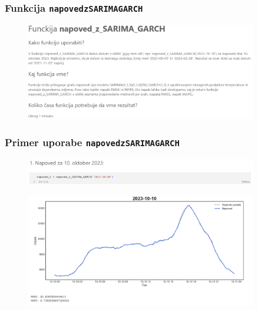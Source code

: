 \documentclass[14p, hyperref={unicode}]{beamer}
\begin{document}

\begin{frame}
    
    \frametitle{Funkcija \texttt{napoved\underline{\enskip}z\underline{\enskip}SARIMA\underline{\enskip}GARCH}} 

    \begin{figure}[h!]
        \centering
        \includegraphics[width=0.9\textwidth]{opis_funkcije.png}
    \end{figure}

\end{frame}



\begin{frame}
    
    \frametitle{Primer uporabe \texttt{napoved\underline{\enskip}z\underline{\enskip}SARIMA\underline{\enskip}GARCH}} 

    \begin{figure}[h!]
        \centering
        \includegraphics[width=0.9\textwidth]{koda.png}
    \end{figure}

    \begin{figure}[h!]
        \centering
        \includegraphics[width=0.9\textwidth]{izpis_funkcije.png}
    \end{figure}

\end{frame}



\end{document}
